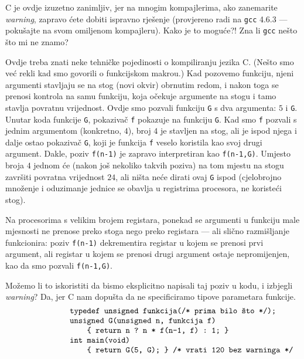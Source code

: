 C je ovdje izuzetno zanimljiv\!, jer na mnogim kompajlerima, ako zanemarite \emph{warning}, zapravo ćete dobiti ispravno rješenje (provjereno radi na \texttt{gcc} 4.6.3 --- pokušajte na svom omiljenom kompajleru). Kako je to moguće?! Zna li \texttt{gcc} nešto što mi ne znamo?

Ovdje treba znati neke tehničke pojedinosti o kompiliranju jezika C. (Nešto smo već rekli kad smo govorili o funkcijskom makrou.) Kad pozovemo funkciju, njeni argumenti stavljaju se na stog (novi okvir) obrnutim redom, i nakon toga se prenosi kontrola na samu funkciju, koja očekuje argumente na stogu i tamo stavlja povratnu vrijednost. Ovdje smo pozvali funkciju \texttt{G} s dva argumenta: $5$ i \texttt{G}. Unutar koda funkcije \texttt{G}, pokazivač \texttt f pokazuje na funkciju \texttt{G}. Kad smo \texttt f pozvali s jednim argumentom (konkretno, $4$), broj $4$ je stavljen na stog, ali je ispod njega i dalje ostao pokazivač \texttt{G}, koji je funkcija \texttt f veselo koristila kao svoj drugi argument. Dakle, poziv \texttt{f(n-1)} je zapravo interpretiran kao \texttt{f(n-1,G)}. Umjesto broja $4$ jednom će (nakon još nekoliko takvih poziva) na tom mjestu na stogu završiti povratna vrijednost $24$, ali ništa neće dirati ovaj \texttt{G} ispod (cjelobrojno množenje i oduzimanje jednice se obavlja u registrima procesora, ne koristeći stog).

Na procesorima s velikim brojem registara, ponekad se argumenti u funkciju male mjesnosti ne prenose preko stoga nego preko registara --- ali slično razmišljanje funkcionira: poziv \texttt{f(n-1)} dekrementira registar u kojem se prenosi prvi argument, ali registar u kojem se prenosi drugi argument ostaje nepromijenjen, kao da smo pozvali \texttt{f(n-1,G)}.

Možemo li to iskoristiti da bismo eksplicitno napisali taj poziv u kodu, i izbjegli \emph{warning}? Da, jer C nam dopušta da ne specificiramo tipove parametara funkcije.
\begin{equation}\begin{minipage}{0.8\textwidth}
\begin{verbatim}
       typedef unsigned funkcija(/* prima bilo što */);
       unsigned G(unsigned n, funkcija f)
           { return n ? n * f(n-1, f) : 1; }
       int main(void)
           { return G(5, G); } /* vrati 120 bez warninga */
\end{verbatim}
\end{minipage}\end{equation}

